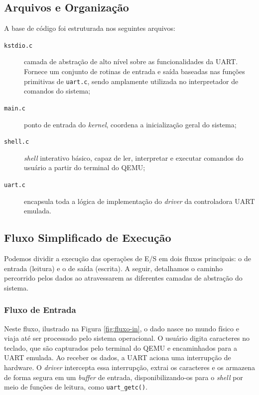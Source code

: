 \subsection{Arquivos e Organização}

A base de código foi estruturada nos seguintes arquivos:

\begin{description}
    \item[\texttt{kstdio.c}] camada de abstração de alto nível sobre as funcionalidades da UART. Fornece um conjunto de rotinas de entrada e saída baseadas nas funções primitivas de \texttt{uart.c}, sendo amplamente utilizada no interpretador de comandos do sistema;
    \item[\texttt{main.c}] ponto de entrada do \textit{kernel}, coordena a inicialização geral do sistema;
    \item[\texttt{shell.c}] \textit{shell} interativo básico, capaz de ler, interpretar e executar comandos do usuário a partir do terminal do QEMU;
    \item[\texttt{uart.c}] encapsula toda a lógica de implementação do \textit{driver} da controladora UART emulada.
\end{description}

\subsection{Fluxo Simplificado de Execução}

Podemos dividir a execução das operações de E/S em dois fluxos principais: o de entrada (leitura) e o de saída (escrita). A seguir, detalhamos o caminho percorrido pelos dados ao atravessarem as diferentes camadas de abstração do sistema.

\subsubsection{Fluxo de Entrada}

Neste fluxo, ilustrado na Figura \ref{fig:fluxo-in}, o dado nasce no mundo físico e viaja até ser processado pelo sistema operacional. O usuário digita caracteres no teclado, que são capturados pelo terminal do QEMU e encaminhados para a UART emulada. Ao receber os dados, a UART aciona uma interrupção de hardware. O \textit{driver} intercepta essa interrupção, extrai os caracteres e os armazena de forma segura em um \textit{buffer} de entrada, disponibilizando-os para o \textit{shell} por meio de funções de leitura, como \texttt{uart\_getc()}.

